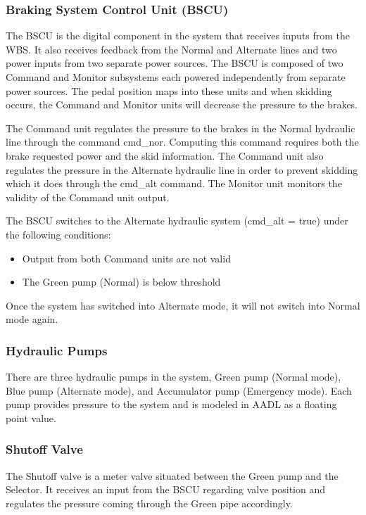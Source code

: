 \subsubsection{Braking System Control Unit (BSCU)}
The BSCU is the digital component in the system that receives inputs from the WBS. It also receives feedback from the Normal and Alternate lines and two power inputs from two separate power sources. The BSCU is composed of two Command and Monitor subsystems each powered independently from separate power sources. The pedal position maps into these units and when skidding occurs, the Command and Monitor units will decrease the pressure to the brakes.

The Command unit regulates the pressure to the brakes in the Normal hydraulic line through the command cmd\_nor. Computing this command requires both the brake requested power and the skid information. The Command unit also regulates the pressure in the Alternate hydraulic line in order to prevent skidding which it does through the cmd\_alt command. The Monitor unit monitors the validity of the Command unit output.

The BSCU switches to the Alternate hydraulic system (cmd\_alt = true) under the following conditions:
\begin{itemize}
\item Output from both Command units are not valid
\item The Green pump (Normal) is below threshold
\end{itemize}

Once the system has switched into Alternate mode, it will not switch into Normal mode again.

\subsubsection{Hydraulic Pumps}
There are three hydraulic pumps in the system, Green pump (Normal mode), Blue pump (Alternate mode), and Accumulator pump (Emergency mode). Each pump provides pressure to the system and is modeled in AADL as a floating point value.

\subsubsection{Shutoff Valve}

The Shutoff valve is a meter valve situated between the Green pump and the Selector. It receives an input from the BSCU regarding valve position and regulates the pressure coming through the Green pipe accordingly.

